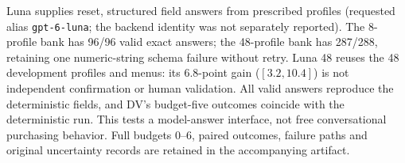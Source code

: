 Luna supplies reset, structured field answers from prescribed profiles (requested alias \texttt{gpt-6-luna}; the backend identity was not separately reported). The 8-profile bank has 96/96 valid exact answers; the 48-profile bank has 287/288, retaining one numeric-string schema failure without retry. Luna 48 reuses the 48 development profiles and menus: its 6.8-point gain ($[3.2,10.4]$) is not independent confirmation or human validation. All valid answers reproduce the deterministic fields, and DV's budget-five outcomes coincide with the deterministic run. This tests a model-answer interface, not free conversational purchasing behavior. Full budgets 0--6, paired outcomes, failure paths and original uncertainty records are retained in the accompanying artifact.
